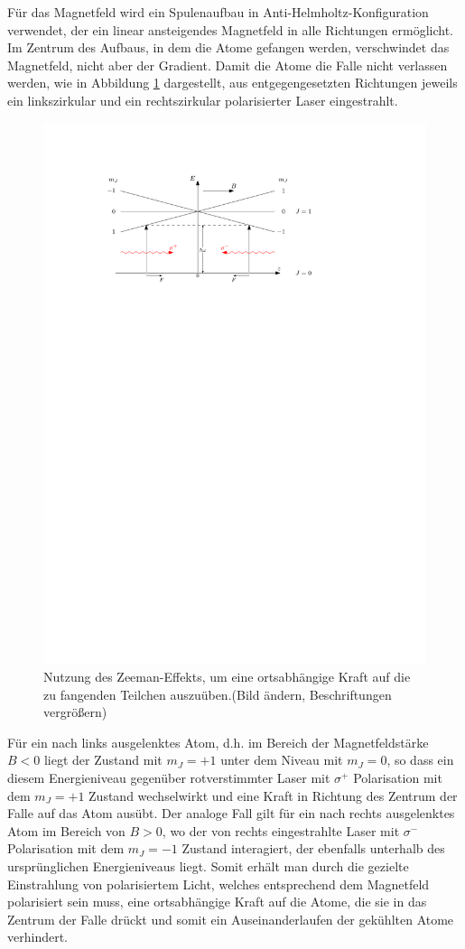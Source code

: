 \documentclass[11pt, a4paper]{article}
\numberwithin{equation}{section}
\newcommand{\korr}[1]{{\color{red}(#1)}}
\begin{document}
Für das Magnetfeld wird ein Spulenaufbau in Anti-Helmholtz-Konfiguration verwendet, der ein linear ansteigendes Magnetfeld in alle Richtungen ermöglicht.
Im Zentrum des Aufbaus, in dem die Atome gefangen werden, verschwindet das Magnetfeld, nicht aber der Gradient.
Damit die Atome die Falle nicht verlassen werden, wie in Abbildung \ref{fig:magnetfeld} dargestellt, aus entgegengesetzten Richtungen jeweils ein linkszirkular und ein rechtszirkular polarisierter Laser eingestrahlt.
\begin{figure}[h]
	\centering
	\includegraphics[width=.8\textwidth]{./figures/theory/mot.pdf}
	\caption{Nutzung des Zeeman-Effekts, um eine ortsabhängige Kraft auf die zu fangenden Teilchen auszuüben.\korr{Bild ändern, Beschriftungen vergrößern}}
	\label{fig:magnetfeld}
\end{figure}
Für ein nach links ausgelenktes Atom, d.h. im Bereich der Magnetfeldstärke $B<0$ liegt der Zustand mit $m_J=+1$ unter dem Niveau mit $m_J=0$, so dass ein diesem Energieniveau gegenüber rotverstimmter Laser mit $\sigma^+$ Polarisation mit dem $m_J=+1$ Zustand wechselwirkt und eine Kraft in Richtung des Zentrum der Falle auf das Atom ausübt.
Der analoge Fall gilt für ein nach rechts ausgelenktes Atom im Bereich von $B>0$, wo der von rechts eingestrahlte Laser mit $\sigma^-$ Polarisation mit dem $m_J=-1$ Zustand interagiert, der ebenfalls unterhalb des ursprünglichen Energieniveaus liegt.
Somit erhält man durch die gezielte Einstrahlung von polarisiertem Licht, welches entsprechend dem Magnetfeld polarisiert sein muss, eine ortsabhängige Kraft auf die Atome, die sie in das Zentrum der Falle drückt und somit ein Auseinanderlaufen der gekühlten Atome verhindert.
\end{document}
